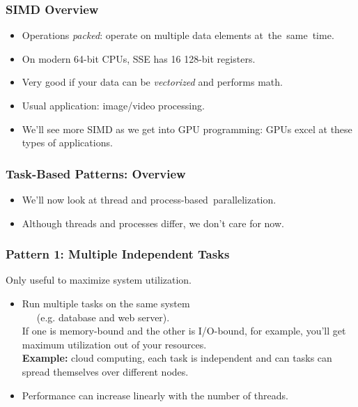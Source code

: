\begin{frame}
  \frametitle{SIMD Overview}

  
  \begin{itemize}
    \item Operations \emph{packed}: operate on multiple data elements 
      at~the~same~time.
    \vfill
    \item On modern 64-bit CPUs, SSE has 16 128-bit registers.
    \vfill
    \item Very good if your data can be \emph{vectorized} and performs math.
    \vfill
    \item Usual application: image/video processing.
    \vfill
    \item We'll see more SIMD as we get into GPU programming: GPUs excel
       at these types of applications.
  \end{itemize}
  

\end{frame}


\begin{frame}
  \frametitle{Task-Based Patterns: Overview}

\Large
  
  \begin{itemize}
    \item We'll now look at thread and process-based~parallelization.
    \item Although threads and processes differ, we don't care for now.
  \end{itemize}
  

\end{frame}

\begin{frame}
  \frametitle{Pattern 1: Multiple Independent Tasks}

  
    Only useful to maximize system utilization.
  \begin{itemize}
    \item Run multiple tasks on the same system \\ ~~~(e.g. database and web server).\\[1em]
     If one is memory-bound and the other is I/O-bound, for example, you'll
      get maximum utilization out of your resources.\\[1em]
     {\bf Example:} cloud computing, each task is independent and can
      tasks can spread themselves over different nodes.\\[1em]
    \item Performance can increase linearly with the number of threads.
  \end{itemize}
  
\end{frame}

